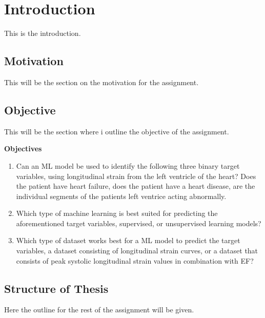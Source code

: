 \chapter{Introduction} \label{chap:intro}

This is the introduction. \bigskip

\section{Motivation}

This will be the section on the motivation for the assignment.

\section{Objective} \label{sec:objective}

This will be the section where i outline the objective of the assignment.

\begin{tcolorbox}
    \textbf{Objectives}

    \begin{enumerate}
        \item Can an ML model be used to identify the following three binary target variables, using longitudinal strain from the left ventricle of the heart? Does the patient have heart failure, does the patient have a heart disease, are the individual segments of the patients left ventrice acting abnormally.
        \item Which type of machine learning is best suited for predicting the aforementioned target variables, supervised, or unsupervised learning models?
        \item Which type of dataset works best for a ML model to predict the target variables, a dataset consisting of longitudinal strain curves, or a dataset that consists of peak systolic longitudinal strain values in combination with EF?
    \end{enumerate}
\end{tcolorbox}

\section{Structure of Thesis}

Here the outline for the rest of the assignment will be given.
